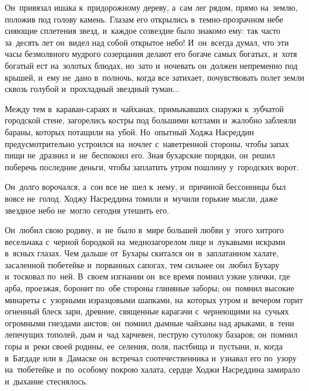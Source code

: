 \documentclass[12pt,a4paper]{book}
\begin{document}
Он~привязал ишака к~придорожному дереву, а~сам лег рядом, прямо на~землю, положив под голову камень. Глазам его открылись в~темно-прозрачном небе сияющие сплетения звезд, и~каждое созвездие было знакомо ему: так часто за~десять лет он~видел над собой открытое небо! И~он~всегда думал, что эти часы безмолвного мудрого созерцания делают его богаче самых богатых, и~хотя богатый ест на~золотых блюдах, но~зато и~ночевать он~должен непременно под крышей, и~ему не~дано в~полночь, когда все затихает, почувствовать полет земли сквозь голубой и~прохладный звездный туман...

Между тем в~караван-сараях и~чайханах, примыкавших снаружи к~зубчатой городской стене, загорелись костры под большими котлами и~жалобно заблеяли бараны, которых потащили на~убой. Но~опытный Ходжа Насреддин предусмотрительно устроился на~ночлег с~наветренной стороны, чтобы запах пищи не~дразнил и~не~беспокоил его. Зная бухарские порядки, он~решил поберечь последние деньги, чтобы заплатить утром пошлину у~городских ворот.

Он~долго ворочался, а~сон все не~шел к~нему, и~причиной бессонницы был вовсе не~голод. Ходжу Насреддина томили и~мучили горькие мысли, даже звездное небо не~могло сегодня утешить его.

Он~любил свою родину, и~не~было в~мире большей любви у~этого хитрого весельчака с~черной бородкой на~меднозагорелом лице и~лукавыми искрами в~ясных глазах. Чем дальше от~Бухары скитался он~в~заплатанном халате, засаленной тюбетейке и~порванных сапогах, тем сильнее он~любил Бухару и~тосковал по~ней. В~своем изгнании он~все время помнил узкие улички, где арба, проезжая, боронит по~обе стороны глиняные заборы; он~помнил высокие минареты с~узорными изразцовыми шапками, на~которых утром и~вечером горит огненный блеск зари, древние, священные карагачи с~чернеющими на~сучьях огромными гнездами аистов; он~помнил дымные чайханы над арыками, в~тени лепечущих тополей, дым и~чад харчевен, пеструю сутолоку базаров; он~помнил горы и~реки своей родины, ее~селения, поля, пастбища и~пустыни, и, когда в~Багдаде или в~Дамаске он~встречал соотечественника и~узнавал его по~узору на~тюбетейке и~по~особому покрою халата, сердце Ходжи Насреддина замирало и~дыхание стеснялось.
\end{document}
